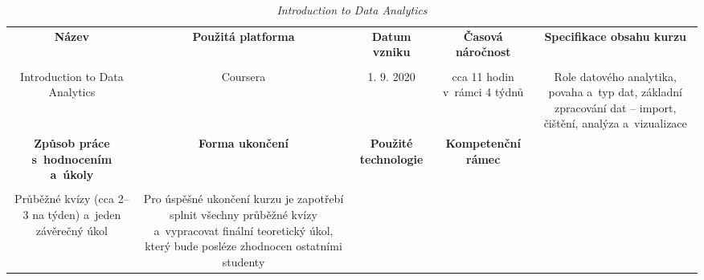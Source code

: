 \begin{landscape}

\begin{table}[htbp]

\renewcommand\thetable{7}

\caption{\textit{Introduction to Data Analytics}}\label{tab6}

\footnotesize

{

\justifying

\begin{tabularx}{\linewidth}{CCCCC}

\toprule

\textbf{Název} &

\textbf{Použitá platforma} &

\textbf{Datum vzniku} &

\textbf{Časová náročnost} &
 
\textbf{Specifikace obsahu kurzu}

\\

\tabularnewline
\midrule

Introduction to Data Analytics

&

Coursera

&

1. 9. 2020

&

cca 11 hodin v~rámci 4 týdnů

&

Role datového analytika, povaha a~typ dat, základní zpracování dat – import, čištění, analýza a~vizualizace

\\
\toprule

\textbf{Způsob práce s~hodnocením a~úkoly} &

\textbf{Forma ukončení} &

\textbf{Použité technologie} &

\textbf{Kompetenční rámec} 

\\

\tabularnewline
\midrule

Průběžné kvízy (cca 2–3 na týden) a~jeden závěrečný úkol    

&

Pro úspěšné ukončení kurzu je zapotřebí splnit všechny průběžné kvízy a~vypracovat finální teoretický úkol, který bude posléze zhodnocen ostatními studenty


\end{tabularx}}
\end{table}
\end{landscape}
